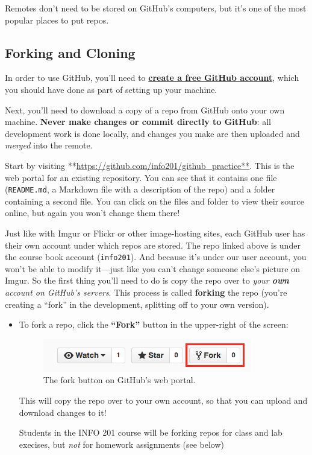 \documentclass[]{book}
\theoremstyle{definition}
\theoremstyle{definition}
\theoremstyle{remark}
\begin{document}
Remotes don't need to be stored on GitHub's computers, but it's one of
the most popular places to put repos.

\subsection{Forking and Cloning}\label{forking-and-cloning}

In order to use GitHub, you'll need to
\href{https://github.com/join}{\textbf{create a free GitHub account}},
which you should have done as part of setting up your machine.

Next, you'll need to download a copy of a repo from GitHub onto your own
machine. \textbf{Never make changes or commit directly to GitHub}: all
development work is done locally, and changes you make are then uploaded
and \emph{merged} into the remote.

Start by visiting **\url{https://github.com/info201/github_practice**}.
This is the web portal for an existing repository. You can see that it
contains one file (\texttt{README.md}, a Markdown file with a
description of the repo) and a folder containing a second file. You can
click on the files and folder to view their source online, but again you
won't change them there!

Just like with Imgur or Flickr or other image-hosting sites, each GitHub
user has their own account under which repos are stored. The repo linked
above is under the course book account (\texttt{info201}). And because
it's under our user account, you won't be able to modify it---just like
you can't change someone else's picture on Imgur. So the first thing
you'll need to do is copy the repo over to \emph{your \textbf{own}
account on GitHub's servers}. This process is called \textbf{forking}
the repo (you're creating a ``fork'' in the development, splitting off
to your own version).

\begin{itemize}
\item
  To fork a repo, click the \textbf{``Fork''} button in the upper-right
  of the screen:

  \begin{figure}
  \centering
  \includegraphics{img/git-basics/fork-button.png}
  \caption{The fork button on GitHub's web portal.}
  \end{figure}

  This will copy the repo over to your own account, so that you can
  upload and download changes to it!

  Students in the INFO 201 course will be forking repos for class and
  lab execises, but \emph{not} for homework assignments (see below)
\end{itemize}
\end{document}
